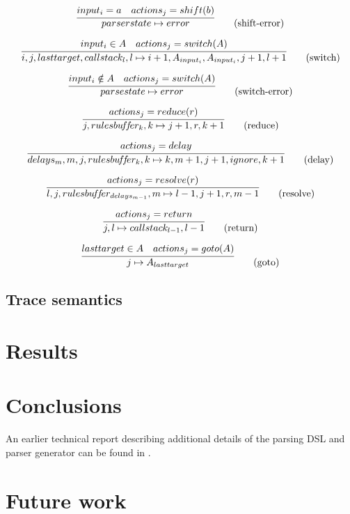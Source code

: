 \documentclass[envcountsame,runningheads]{llncs}
\begin{document}
\begin{equation}
\infer{parserstate \mapsto error}{input_i = a & actions_j = shift(b)} \tag{shift-error}
\end{equation}

\begin{equation}
\infer{i, j, lasttarget, callstack_l, l \mapsto i+1, A_{input_i}, A_{input_i}, j+1, l+1}{input_i \in A & actions_j = switch(A)} \tag{switch}
\end{equation}

\begin{equation}
\infer{parsestate \mapsto error}{input_i \notin A & actions_j = switch(A)} \tag{switch-error}
\end{equation}

\begin{equation}
\infer{j, rulesbu\!f\!f\!er_k, k \mapsto j+1, r, k+1}{actions_j = reduce(r)} \tag{reduce}
\end{equation}

\begin{equation}
\infer{delays_m, m, j, rulesbu\!f\!f\!er_k, k \mapsto k, m+1, j+1, ignore, k+1}{actions_j = delay} \tag{delay}
\end{equation}

\begin{equation}
\infer{l, j, rulesbu\!f\!f\!er_{delays_{m-1}}, m \mapsto l-1, j+1, r, m-1}{actions_j = resolve(r)} \tag{resolve}
\end{equation}

\begin{equation}
\infer{j, l \mapsto callstack_{l-1}, l-1}{actions_j = return} \tag{return}
\end{equation}

\begin{equation}
\infer{j \mapsto A_{lasttarget}}{lasttarget \in A & actions_j = goto(A)} \tag{goto}
\end{equation}

\subsection{Trace semantics}


\section{Results}

\section{Conclusions}
An earlier technical report describing additional details of the parsing DSL and parser generator can be found in \cite{Lin11}.

\section{Future work}



\end{document}
